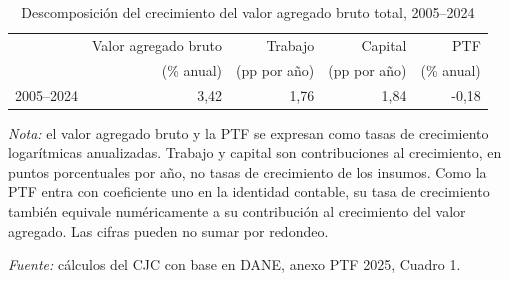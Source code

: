 \begin{table}[H]
\centering
\caption{Descomposición del crecimiento del valor agregado bruto total, 2005--2024}
\label{tab:descomposicion_valor_agregado}
\small
\setlength{\tabcolsep}{12pt}
\begin{tabular}{lrrrr}
\toprule
 & Valor agregado bruto & Trabajo & Capital & PTF \\
 & (\% anual) & (pp por año) & (pp por año) & (\% anual) \\
\midrule
2005--2024 & 3,42 & 1,76 & 1,84 & -0,18 \\
\bottomrule
\end{tabular}
\vspace{0.2em}
\begin{minipage}{0.93\textwidth}
\footnotesize \textit{Nota:} el valor agregado bruto y la PTF se expresan como tasas de crecimiento logarítmicas anualizadas. Trabajo y capital son contribuciones al crecimiento, en puntos porcentuales por año, no tasas de crecimiento de los insumos. Como la PTF entra con coeficiente uno en la identidad contable, su tasa de crecimiento también equivale numéricamente a su contribución al crecimiento del valor agregado. Las cifras pueden no sumar por redondeo.
\par\textit{Fuente:} cálculos del CJC con base en DANE, anexo PTF 2025, Cuadro 1.
\end{minipage}
\end{table}
